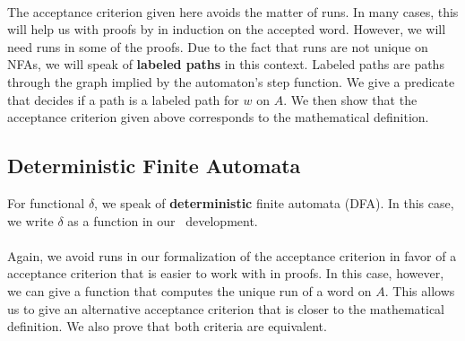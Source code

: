 
\paragraph{}
The acceptance criterion given here avoids the matter of runs.
In many cases, this will help us with proofs by in induction on the accepted word.
However, we will need runs in some of the proofs.
Due to the fact that runs are not unique on NFAs, 
we will speak of \textbf{labeled paths} in this context.
Labeled paths are paths through the graph implied by the automaton's step function.
We give a predicate that decides if a path is a labeled path for $w$ on $A$.
We then show that the acceptance criterion given above corresponds to the mathematical definition.


\subsection{Deterministic Finite Automata}
For functional $\delta$, we speak of \textbf{deterministic} finite automata (DFA). 
In this case, we write $\delta$ as a function in our \coq\ development. 


\paragraph{}
Again, we avoid runs in our formalization of the acceptance criterion in favor of a acceptance criterion that is easier to work with in proofs.
In this case, however, we can give a function that computes the unique run of a word on $A$.
This allows us to give an alternative acceptance criterion that is closer to the mathematical definition.
We also prove that both criteria are equivalent.




